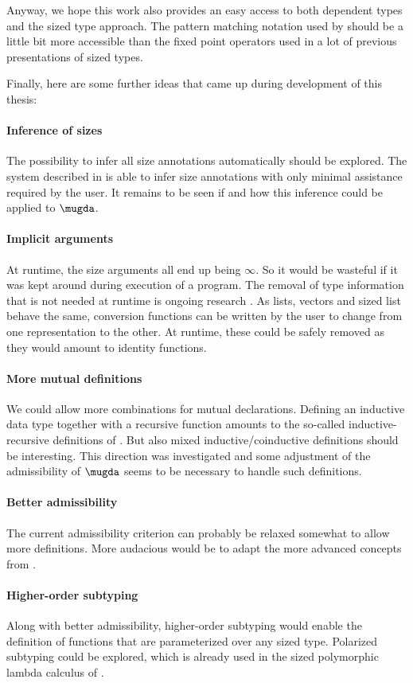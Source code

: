 Anyway, we hope this work also provides an easy access to both dependent types and the sized type approach. 
The pattern matching notation used by \mugda should be a little bit more accessible than the fixed point operators used in a lot of previous presentations of sized types.

Finally, here are some further ideas that came up during development of this thesis:
\paragraph*{Inference of sizes}
The possibility to infer all size annotations automatically should be explored.
The system described in \cite{bgp:lpar06} is able to infer size annotations with only minimal assistance required by the user. It remains to be seen if and how this inference could be applied to $\mugda$. 
\paragraph*{Implicit arguments}
At runtime, the size arguments all end up being $\infty$.
So it would be wasteful if it was kept around during execution of a program. 
The removal of type information that is not needed at runtime is ongoing research \cite{miquel01implicit,DBLP:conf/types/BradyMM03}. As lists, vectors and sized list behave the same, conversion functions can be written by the user to change from one representation to the other. At runtime, these could be safely removed as they would amount to identity functions.
\paragraph*{More mutual definitions}
We could allow more combinations for mutual declarations.
Defining an inductive data type together with a recursive function amounts to the so-called inductive-recursive definitions of \cite{dybjer01indexed}. But also mixed inductive/coinductive definitions should be interesting. This direction was investigated and some adjustment of the admissibility of $\mugda$ seems to be necessary to handle such definitions.
\paragraph*{Better admissibility}
The current admissibility criterion can probably be relaxed somewhat to allow more definitions. 
More audacious would be to adapt the more advanced concepts from \cite{abel:PhD}.
\paragraph*{Higher-order subtyping}
Along with better admissibility, higher-order subtyping would enable the definition of functions that are parameterized over any sized type. Polarized subtyping \cite{steffen:phd} could be explored, which is already used in the sized polymorphic lambda calculus of \cite{abel:PhD}.
